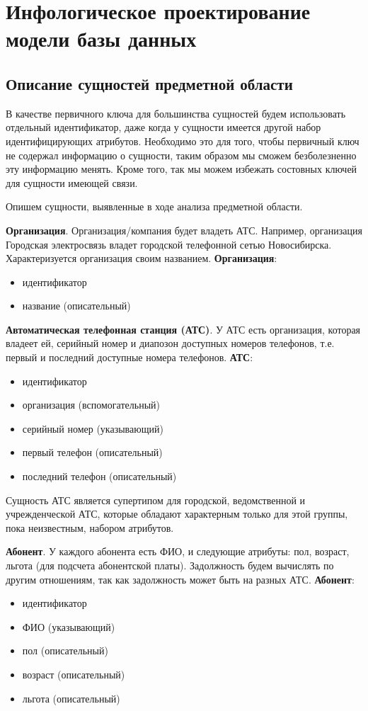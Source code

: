 \documentclass{report}
\begin{document}
\chapter{Инфологическое проектирование модели базы данных}

\section{Описание сущностей предметной области}
В качестве первичного ключа для большинства сущностей будем использовать
отдельный идентификатор, даже когда у сущности имеется другой набор 
идентифицирующих атрибутов.
Необходимо это для того, чтобы первичный ключ не содержал информацию
о сущности, таким образом мы сможем безболезненно эту информацию
менять. Кроме того, так мы можем избежать состовных ключей для 
сущности имеющей связи.

Опишем сущности, выявленные в ходе анализа предметной области.

\textbf{Организация}. Организация/компания будет владеть АТС. 
Например, организация Городская электросвязь владет городской 
телефонной сетью Новосибирска. Характеризуется организация своим 
названием.
\newline\textbf{Организация}:
\begin{itemize}
    \item идентификатор
    \item название (описательный)
\end{itemize}

\textbf{Автоматическая телефонная станция (АТС)}. У АТС есть организация, 
которая владеет ей, серийный номер и диапозон доступных номеров телефонов, 
т.е. первый и последний доступные номера телефонов. 
\newline\textbf{АТС}:
\begin{itemize}
    \item идентификатор
    \item организация (вспомогательный)
    \item серийный номер (указывающий)
    \item первый телефон (описательный)
    \item последний телефон (описательный)
\end{itemize}
Сущность АТС является супертипом для городской, 
ведомственной и учрежден\-чес\-кой АТС, которые обладают характерным только 
для этой группы, пока неизвестным, набором атрибутов.

\textbf{Абонент}. У каждого абонента есть ФИО, 
и следующие атрибуты: пол, возраст, льгота (для подсчета 
абонентской платы). Задолжность будем вычислять по другим отношениям, 
так как задолжность может быть на разных АТС. 
\newline\textbf{Абонент}:
\begin{itemize}
    \item идентификатор
    \item ФИО (указывающий)
    \item пол (описательный)
    \item возраст (описательный)
    \item льгота (описательный)
\end{itemize}
\end{document}
